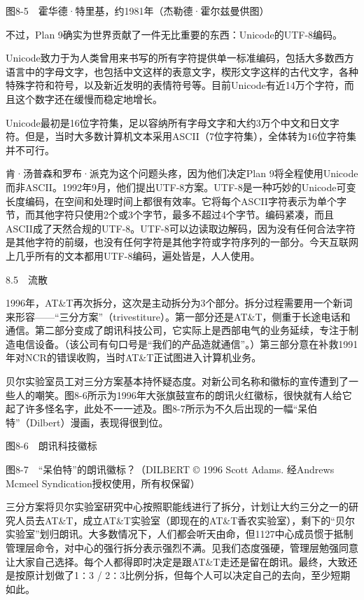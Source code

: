 \documentclass[a4paper,12pt,UTF8,twoside]{ctexbook}
\begin{document}
{{图8-5　霍华德·特里基，约1981年（杰勒德·霍尔兹曼供图）

不过，Plan 9确实为世界贡献了一件无比重要的东西：Unicode的UTF-8编码。

Unicode致力于为人类曾用来书写的所有字符提供单一标准编码，包括大多数西方语言中的字母文字，也包括中文这样的表意文字，楔形文字这样的古代文字，各种特殊字符和符号，以及新近发明的表情符号等。目前Unicode有近14万个字符，而且这个数字还在缓慢而稳定地增长。

Unicode最初是16位字符集，足以容纳所有字母文字和大约3万个中文和日文字符。但是，当时大多数计算机文本采用ASCII（7位字符集），全体转为16位字符集并不可行。

肯·汤普森和罗布·派克为这个问题头疼，因为他们决定Plan 9将全程使用Unicode而非ASCII。1992年9月，他们提出UTF-8方案。UTF-8是一种巧妙的Unicode可变长度编码，在空间和处理时间上都很有效率。它将每个ASCII字符表示为单个字节，而其他字符只使用2个或3个字节，最多不超过4个字节。编码紧凑，而且ASCII成了天然合规的UTF-8。UTF-8可以边读取边解码，因为没有任何合法字符是其他字符的前缀，也没有任何字符是其他字符或字符序列的一部分。今天互联网上几乎所有的文本都用UTF-8编码，遍处皆是，人人使用。





8.5　流散


1996年，AT\&T再次拆分，这次是主动拆分为3个部分。拆分过程需要用一个新词来形容——“三分方案”（trivestiture）。第一部分还是AT\&T，侧重于长途电话和通信。第二部分变成了朗讯科技公司，它实际上是西部电气的业务延续，专注于制造电信设备。（该公司有句口号是“我们的产品造就通信”。）第三部分意在补救1991年对NCR的错误收购，当时AT\&T正试图进入计算机业务。

贝尔实验室员工对三分方案基本持怀疑态度。对新公司名称和徽标的宣传遭到了一些人的嘲笑。图8-6所示为1996年大张旗鼓宣布的朗讯火红徽标，很快就有人给它起了许多怪名字，此处不一一述及。图8-7所示为不久后出现的一幅“呆伯特”（Dilbert）漫画，表现得很到位。



图8-6　朗讯科技徽标



图8-7　“呆伯特”的朗讯徽标？（DILBERT © 1996 Scott Adams. 经Andrews Mcmeel Syndication授权使用，所有权保留）

三分方案将贝尔实验室研究中心按照职能线进行了拆分，计划让大约三分之一的研究人员去AT\&T，成立AT\&T实验室（即现在的AT\&T香农实验室），剩下的“贝尔实验室”划归朗讯。大多数情况下，人们都会听天由命，但1127中心成员惯于抵制管理层命令，对中心的强行拆分表示强烈不满。见我们态度强硬，管理层勉强同意让大家自己选择。每个人都得即时决定是跟AT\&T走还是留在朗讯。最终，大致还是按原计划做了1∶3 / 2∶3比例分拆，但每个人可以决定自己的去向，至少短期如此。

}}
\end{document}

